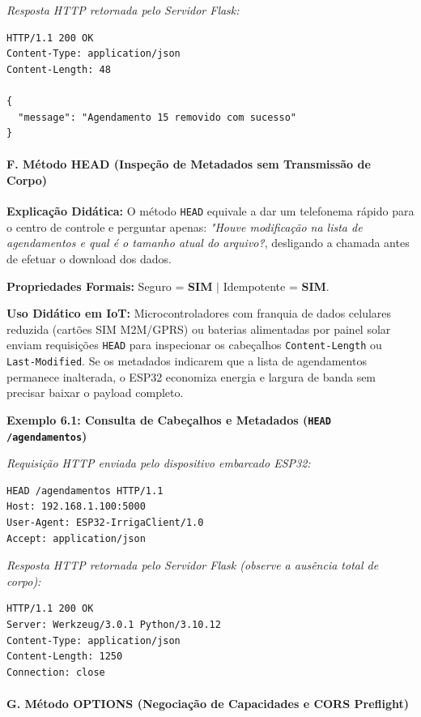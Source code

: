 \textit{Resposta HTTP retornada pelo Servidor Flask:}
\begin{lstlisting}
HTTP/1.1 200 OK
Content-Type: application/json
Content-Length: 48

{
  "message": "Agendamento 15 removido com sucesso"
}
\end{lstlisting}

\paragraph*{F. Método HEAD (Inspeção de Metadados sem Transmissão de Corpo)}

\textbf{Explicação Didática:} O método \texttt{HEAD} equivale a dar um telefonema rápido para o centro de controle e perguntar apenas: \textit{"Houve modificação na lista de agendamentos e qual é o tamanho atual do arquivo?\"}, desligando a chamada antes de efetuar o download dos dados.

\textbf{Propriedades Formais:} Seguro = \textbf{SIM} $|$ Idempotente = \textbf{SIM}.

\textbf{Uso Didático em IoT:} Microcontroladores com franquia de dados celulares reduzida (cartões SIM M2M/GPRS) ou baterias alimentadas por painel solar enviam requisições \texttt{HEAD} para inspecionar os cabeçalhos \texttt{Content-Length} ou \texttt{Last-Modified}. Se os metadados indicarem que a lista de agendamentos permanece inalterada, o ESP32 economiza energia e largura de banda sem precisar baixar o payload completo.

\textbf{Exemplo 6.1: Consulta de Cabeçalhos e Metadados (\texttt{HEAD /agendamentos})}

\textit{Requisição HTTP enviada pelo dispositivo embarcado ESP32:}
\begin{lstlisting}
HEAD /agendamentos HTTP/1.1
Host: 192.168.1.100:5000
User-Agent: ESP32-IrrigaClient/1.0
Accept: application/json

\end{lstlisting}

\textit{Resposta HTTP retornada pelo Servidor Flask (observe a ausência total de corpo):}
\begin{lstlisting}
HTTP/1.1 200 OK
Server: Werkzeug/3.0.1 Python/3.10.12
Content-Type: application/json
Content-Length: 1250
Connection: close

\end{lstlisting}

\paragraph*{G. Método OPTIONS (Negociação de Capacidades e CORS Preflight)}

